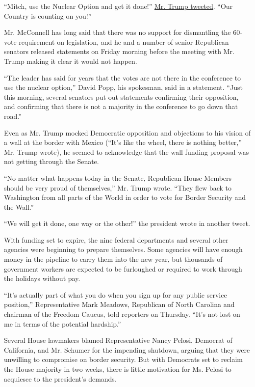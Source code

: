 ``Mitch, use the Nuclear Option and get it done!''
\href{https://twitter.com/realDonaldTrump/status/1076100620581511170}{Mr.
Trump tweeted}. ``Our Country is counting on you!''

Mr. McConnell has long said that there was no support for dismantling
the 60-vote requirement on legislation, and he and a number of senior
Republican senators released statements on Friday morning before the
meeting with Mr. Trump making it clear it would not happen.

``The leader has said for years that the votes are not there in the
conference to use the nuclear option,'' David Popp, his spokesman, said
in a statement. ``Just this morning, several senators put out statements
confirming their opposition, and confirming that there is not a majority
in the conference to go down that road.''

Even as Mr. Trump mocked Democratic opposition and objections to his
vision of a wall at the border with Mexico (``It's like the wheel, there
is nothing better,'' Mr. Trump wrote), he seemed to acknowledge that the
wall funding proposal was not getting through the Senate.

``No matter what happens today in the Senate, Republican House Members
should be very proud of themselves,'' Mr. Trump wrote. ``They flew back
to Washington from all parts of the World in order to vote for Border
Security and the Wall.''

``We will get it done, one way or the other!'' the president wrote in
another tweet.

With funding set to expire, the nine federal departments and several
other agencies were beginning to prepare themselves. Some agencies will
have enough money in the pipeline to carry them into the new year, but
thousands of government workers are expected to be furloughed or
required to work through the holidays without pay.

``It's actually part of what you do when you sign up for any public
service position,'' Representative Mark Meadows, Republican of North
Carolina and chairman of the Freedom Caucus, told reporters on Thursday.
``It's not lost on me in terms of the potential hardship.''

Several House lawmakers blamed Representative Nancy Pelosi, Democrat of
California, and Mr. Schumer for the impending shutdown, arguing that
they were unwilling to compromise on border security. But with Democrats
set to reclaim the House majority in two weeks, there is little
motivation for Ms. Pelosi to acquiesce to the president's demands.

